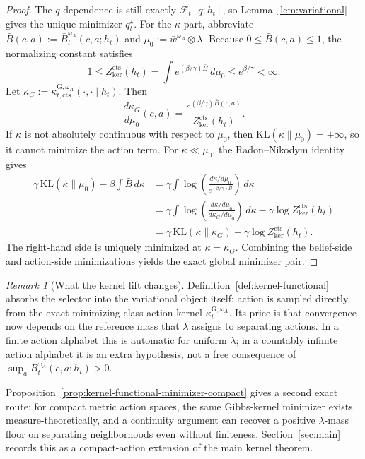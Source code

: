 \documentclass[11pt]{article}
\theoremstyle{definition}
\theoremstyle{remark}
\newtheorem{remark}[theorem]{Remark}
\newcommand{\KL}{\mathrm{KL}}
\begin{document}
\begin{proof}
The $q$-dependence is still exactly $\mathcal F_t[q;h_t]$, so Lemma~\ref{lem:variational} gives the unique minimizer $q_t^\star$. For the $\kappa$-part, abbreviate $\bar B(c,a):=\bar B_t^{\omega_A}(c,a;h_t)$ and $\mu_0:=\bar w^{\omega_A}\otimes\lambda$. Because $0\le \bar B(c,a)\le 1$, the normalizing constant satisfies
\[
1\le Z_{\mathrm{ker}}^{\mathrm{cts}}(h_t)=\int e^{(\beta/\gamma)\bar B}\,d\mu_0\le e^{\beta/\gamma}<\infty.
\]
Let $\kappa_G:=\kappa_{t,\mathrm{cts}}^{\mathrm G,\omega_A}(\cdot,\cdot\mid h_t)$. Then
\[
\frac{d\kappa_G}{d\mu_0}(c,a)=\frac{e^{(\beta/\gamma)\bar B(c,a)}}{Z_{\mathrm{ker}}^{\mathrm{cts}}(h_t)}.
\]
If $\kappa$ is not absolutely continuous with respect to $\mu_0$, then $\KL(\kappa\|\mu_0)=+\infty$, so it cannot minimize the action term. For $\kappa\ll\mu_0$, the Radon--Nikodym identity gives
\begin{align*}
\gamma\,\KL(\kappa\|\mu_0)-\beta\int \bar B\,d\kappa
&=\gamma\int \log\!\left(\frac{d\kappa/d\mu_0}{e^{(\beta/\gamma)\bar B}}\right)\,d\kappa\\
&=\gamma\int \log\!\left(\frac{d\kappa/d\mu_0}{d\kappa_G/d\mu_0}\right)\,d\kappa-\gamma\log Z_{\mathrm{ker}}^{\mathrm{cts}}(h_t)\\
&=\gamma\,\KL(\kappa\|\kappa_G)-\gamma\log Z_{\mathrm{ker}}^{\mathrm{cts}}(h_t).
\end{align*}
The right-hand side is uniquely minimized at $\kappa=\kappa_G$. Combining the belief-side and action-side minimizations yields the exact global minimizer pair.
\end{proof}

\begin{remark}[What the kernel lift changes]
\label{rem:kernel-functional-scope}
Definition~\ref{def:kernel-functional} absorbs the selector into the variational object itself: action is sampled directly from the exact minimizing class-action kernel $\kappa_t^{\mathrm G,\omega_A}$. Its price is that convergence now depends on the reference mass that $\lambda$ assigns to separating actions. In a finite action alphabet this is automatic for uniform $\lambda$; in a countably infinite action alphabet it is an extra hypothesis, not a free consequence of $\sup_a B_t^{\omega_A}(c,a;h_t)>0$.
\par
Proposition~\ref{prop:kernel-functional-minimizer-compact} gives a second exact route: for compact metric action spaces, the same Gibbs-kernel minimizer exists measure-theoretically, and a continuity argument can recover a positive $\lambda$-mass floor on separating neighborhoods even without finiteness. Section~\ref{sec:main} records this as a compact-action extension of the main kernel theorem.
\end{remark}
\end{document}
